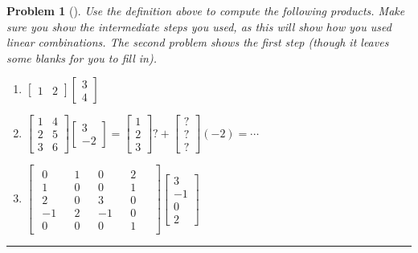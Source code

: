 \documentclass[letterpaper,oneside]{book}%
\theoremstyle{plain}
\theoremstyle{box}
\theoremstyle{problem}
\newtheorem{problemnum}{Problem}[chapter]
\newenvironment{problem}[1][]{\begin{problemnum}[#1]}{\end{problemnum}\nopagebreak\hrule\bigskip}
\newcommand{\nvec}[1]{\begin{matrix} #1 \end{matrix}}
\begin{document}
\begin{problem}
 Use the definition above to compute the following products. Make sure you show the intermediate steps you used, as this will show how you used linear combinations. The second problem shows the first step (though it leaves some blanks for you to fill in).
\begin{enumerate}
 \item 
$
\begin{bmatrix}
  1&2
\end{bmatrix}
\begin{bmatrix}
  3\\4
\end{bmatrix}
$
 \item 
$
\begin{bmatrix}
  1&4\\2&5\\3&6
\end{bmatrix}
\begin{bmatrix}
  3\\-2
\end{bmatrix}
=
\begin{bmatrix}
  1\\2\\3
\end{bmatrix}
?+
\begin{bmatrix}
  ?\\?\\?
\end{bmatrix}
(-2)
=\cdots$
 \item 
$
\begin{bmatrix}
  \nvec{0\\1\\2\\-1\\0}&
  \nvec{1\\0\\0\\2\\0}&
  \nvec{0\\0\\3\\-1\\0}&
  \nvec{2\\1\\0\\0\\1}&
\end{bmatrix}
\begin{bmatrix}
  3\\-1\\0\\2
\end{bmatrix}
$
\end{enumerate}
 
\end{problem}
\end{document}
